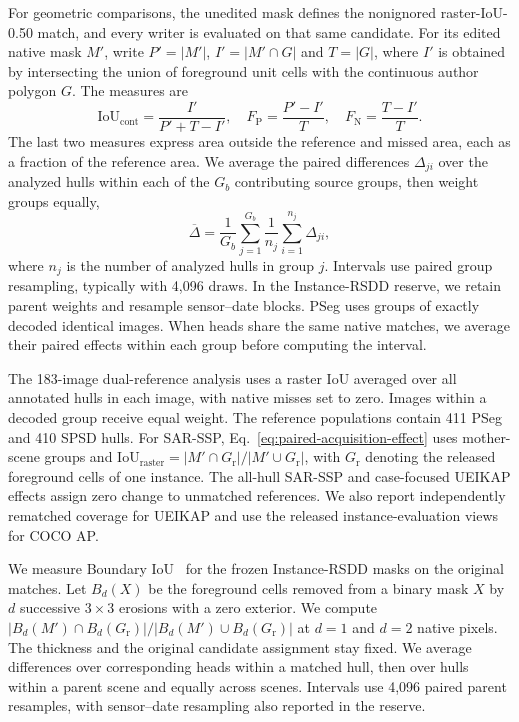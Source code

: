 \documentclass[journal]{IEEEtran}
\begin{document}
For geometric comparisons, the unedited mask defines the nonignored raster-IoU-0.50 match, and every writer is evaluated on that same candidate. For its edited native mask \(M'\), write \(P'=|M'|\), \(I'=|M'\cap G|\) and \(T=|G|\), where \(I'\) is obtained by intersecting the union of foreground unit cells with the continuous author polygon \(G\). The measures are
\begin{equation}
 \mathrm{IoU}_{\mathrm{cont}}=\frac{I'}{P'+T-I'},\quad
 F_{\mathrm{P}}=\frac{P'-I'}{T},\quad F_{\mathrm{N}}=\frac{T-I'}{T}.
 \label{eq:fixed-geometry-metrics}
\end{equation}
The last two measures express area outside the reference and missed area, each as a fraction of the reference area. We average the paired differences \(\Delta_{ji}\) over the analyzed hulls within each of the \(G_b\) contributing source groups, then weight groups equally,
\begin{equation}
 \overline\Delta=\frac{1}{G_b}\sum_{j=1}^{G_b}
                 \frac{1}{n_j}\sum_{i=1}^{n_j}\Delta_{ji},
 \label{eq:paired-acquisition-effect}
\end{equation}
where \(n_j\) is the number of analyzed hulls in group \(j\). Intervals use paired group resampling, typically with 4,096 draws. In the Instance-RSDD reserve, we retain parent weights and resample sensor--date blocks. PSeg uses groups of exactly decoded identical images. When heads share the same native matches, we average their paired effects within each group before computing the interval.

The 183-image dual-reference analysis uses a raster IoU averaged over all annotated hulls in each image, with native misses set to zero. Images within a decoded group receive equal weight. The reference populations contain 411 PSeg and 410 SPSD hulls. For SAR-SSP, Eq.~\eqref{eq:paired-acquisition-effect} uses mother-scene groups and \(\mathrm{IoU}_{\mathrm{raster}}=|M'\cap G_{\mathrm{r}}|/|M'\cup G_{\mathrm{r}}|\), with \(G_{\mathrm{r}}\) denoting the released foreground cells of one instance. The all-hull SAR-SSP and case-focused UEIKAP effects assign zero change to unmatched references. We also report independently rematched coverage for UEIKAP and use the released instance-evaluation views for COCO AP.

We measure Boundary IoU~\cite{boundaryiou} for the frozen Instance-RSDD masks on the original matches. Let \(B_d(X)\) be the foreground cells removed from a binary mask \(X\) by \(d\) successive \(3\times3\) erosions with a zero exterior. We compute \(|B_d(M')\cap B_d(G_{\mathrm r})|/|B_d(M')\cup B_d(G_{\mathrm r})|\) at \(d=1\) and \(d=2\) native pixels. The thickness and the original candidate assignment stay fixed. We average differences over corresponding heads within a matched hull, then over hulls within a parent scene and equally across scenes. Intervals use 4,096 paired parent resamples, with sensor--date resampling also reported in the reserve.
\end{document}
